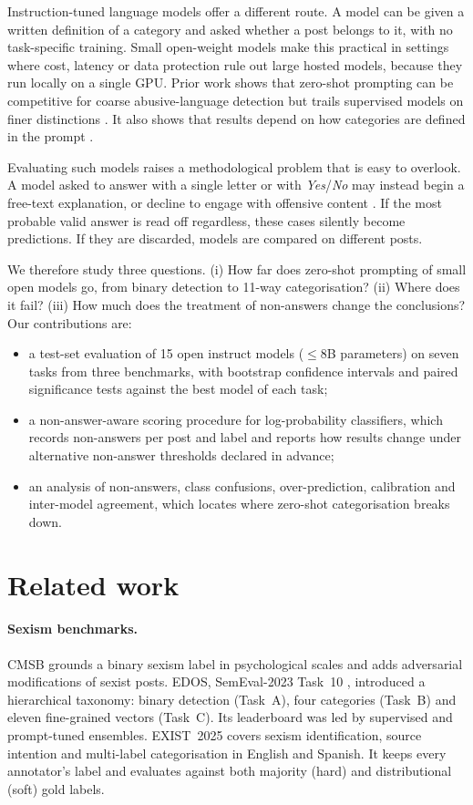 \documentclass[11pt]{article}
\begin{document}
Instruction-tuned language models offer a different route. A model can be given a written definition of a category and asked whether a post belongs to it, with no task-specific training. Small open-weight models make this practical in settings where cost, latency or data protection rule out large hosted models, because they run locally on a single GPU. Prior work shows that zero-shot prompting can be competitive for coarse abusive-language detection but trails supervised models on finer distinctions \citep{plazadelarco2023respectful,ziems2024css,riahisamani2025rlhf}. It also shows that results depend on how categories are defined in the prompt \citep{reuver2025tell}.

Evaluating such models raises a methodological problem that is easy to overlook. A model asked to answer with a single letter or with \emph{Yes}/\emph{No} may instead begin a free-text explanation, or decline to engage with offensive content \citep{rottger2024xstest}. If the most probable valid answer is read off regardless, these cases silently become predictions. If they are discarded, models are compared on different posts.

We therefore study three questions. (i) How far does zero-shot prompting of small open models go, from binary detection to 11-way categorisation? (ii) Where does it fail? (iii) How much does the treatment of non-answers change the conclusions? Our contributions are:
\begin{itemize}
  \item a test-set evaluation of 15 open instruct models ($\leq$8B parameters) on seven tasks from three benchmarks, with bootstrap confidence intervals and paired significance tests against the best model of each task;
  \item a non-answer-aware scoring procedure for log-probability classifiers, which records non-answers per post and label and reports how results change under alternative non-answer thresholds declared in advance;
  \item an analysis of non-answers, class confusions, over-prediction, calibration and inter-model agreement, which locates where zero-shot categorisation breaks down.
\end{itemize}

\section{Related work}\label{sec:related}
\paragraph{Sexism benchmarks.} CMSB \citep{samory2021callme} grounds a binary sexism label in psychological scales and adds adversarial modifications of sexist posts. EDOS, SemEval-2023 Task~10 \citep{kirk2023semeval}, introduced a hierarchical taxonomy: binary detection (Task~A), four categories (Task~B) and eleven fine-grained vectors (Task~C). Its leaderboard was led by supervised and prompt-tuned ensembles. EXIST~2025 \citep{plaza2025exist} covers sexism identification, source intention and multi-label categorisation in English and Spanish. It keeps every annotator's label and evaluates against both majority (hard) and distributional (soft) gold labels.
\end{document}
